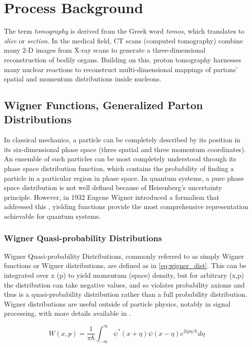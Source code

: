 \section{Process Background}
  The term \textit{tomography} is derived from the Greek word \textit{tomos}, which translates to \textit{slice} or \textit{section}. In the medical field, CT scans (computed tomography) combine many 2-D images from X-ray scans to generate a three-dimensional reconstruction of bodily organs. Building on this, proton tomography harnesses many nuclear reactions to reconstruct multi-dimensional mappings of partons' spatial and momentum distributions inside nucleons. 


    \subsection{Wigner Functions, Generalized Parton Distributions}

        In classical mechanics, a particle can be completely described by its position in its six-dimensional phase space (three spatial and three momentum coordinates). An ensemble of such particles can be most completely understood through its phase space distribution function, which contains the probability of finding a particle in a particular region in phase space. In quantum systems, a pure phase space distribution is not well defined because of Heisenberg's uncertainty principle. However, in 1932 Eugene Wigner introduced a formalism that addressed this \parencite{Wigner1932OnEquilibrium}, yielding functions provide the most comprehensive representation achievable for quantum systems.
        
        
        \subsubsection*{Wigner Quasi-probability Distributions}
             Wigner Quasi-probability Distributions, commonly referred to as simply Wigner functions or Wigner distributions, are defined as in \eqref{eq:wigner_dist}. This can be integrated over x (p) to yield momentum (space) density, but for arbitrary (x,p) the distribution can take negative values, and so violates probability axioms and thus is a quasi-probability distribution rather than a full probability distribution. Wigner distributions are useful outside of particle physics, notably in signal processing, with more details available in \parencite{Hillery1984DistributionFundamentals}.

             \begin{equation}\label{eq:wigner_dist}
                W(x,p) = \frac{1}{\pi\hbar} \int_{-\infty}^{\infty} \psi^*(x+\eta) \psi(x-\eta) e^{2ip \eta/\hbar} d\eta
            \end{equation}

